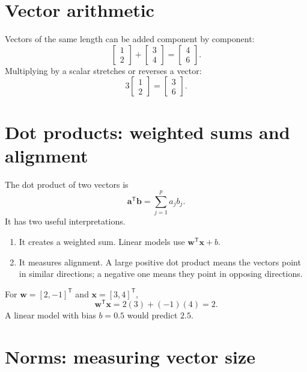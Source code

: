 \section{Vector arithmetic}

Vectors of the same length can be added component by component:
\[
\begin{bmatrix}1\\2\end{bmatrix}+
\begin{bmatrix}3\\4\end{bmatrix}=
\begin{bmatrix}4\\6\end{bmatrix}.
\]
Multiplying by a scalar stretches or reverses a vector:
\[
3\begin{bmatrix}1\\2\end{bmatrix}=
\begin{bmatrix}3\\6\end{bmatrix}.
\]

\section{Dot products: weighted sums and alignment}

The dot product of two vectors is
\[
  \bm{a}^{\mathsf T}\bm{b}=\sum_{j=1}^{p}a_jb_j.
\]
It has two useful interpretations.

\begin{enumerate}
  \item It creates a weighted sum. Linear models use $\bm{w}^{\mathsf T}\bm{x}+b$.
  \item It measures alignment. A large positive dot product means the vectors point in similar directions; a negative one means they point in opposing directions.
\end{enumerate}

\begin{workedexample}
For $\bm{w}=[2,-1]^{\mathsf T}$ and $\bm{x}=[3,4]^{\mathsf T}$,
\[
\bm{w}^{\mathsf T}\bm{x}=2(3)+(-1)(4)=2.
\]
A linear model with bias $b=0.5$ would predict $2.5$.
\end{workedexample}

\section{Norms: measuring vector size}

